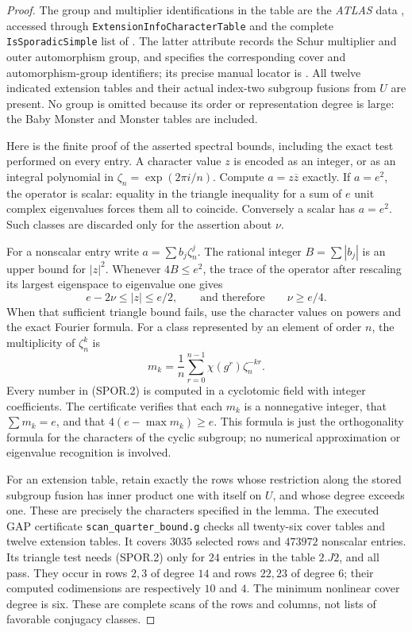 \begin{proof}
The group and multiplier identifications in the table are the
\emph{ATLAS} data \cite{SPOR:Atlas}, accessed through
\texttt{ExtensionInfoCharacterTable} and the complete
\texttt{IsSporadicSimple} list of \cite{SPOR:CTblLib}.
The latter attribute records the Schur multiplier and outer
automorphism group, and specifies the corresponding cover and
automorphism-group identifiers; its precise manual locator is
\cite[\S3.7, entry \texttt{ExtensionInfoCharacterTable}]{SPOR:CTblLib}.
All twelve indicated extension tables and their actual index-two
subgroup fusions from $U$ are present.  No group is omitted because
its order or representation degree is large: the Baby Monster and
Monster tables are included.

Here is the finite proof of the asserted spectral bounds, including
the exact test performed on every entry.  A character value $z$ is
encoded as an integer, or as an integral polynomial in
$\zeta_n=\exp(2\pi i/n)$.  Compute $a=z\overline z$ exactly.
If $a=e^2$, the operator is scalar: equality in the triangle
inequality for a sum of $e$ unit complex eigenvalues forces them
all to coincide.  Conversely a scalar has $a=e^2$.  Such classes
are discarded only for the assertion about $\nu$.

For a nonscalar entry write $a=\sum b_j\zeta_n^j$.  The rational
integer $B=\sum|b_j|$ is an upper bound for $|z|^2$.  Whenever
$4B\le e^2$, the trace of the operator after rescaling its largest
eigenspace to eigenvalue one gives
\[
 e-2\nu\le |z|\le e/2,
 \qquad\text{and therefore}\qquad \nu\ge e/4.       \tag{SPOR.1}
\]
When that sufficient triangle bound fails, use the character values
on powers and the exact Fourier formula.  For a class represented
by an element of order $n$, the multiplicity of $\zeta_n^k$ is
\[
 m_k=\frac1n\sum_{r=0}^{n-1}\chi(g^r)\zeta_n^{-kr}.
                                                               \tag{SPOR.2}
\]
Every number in (SPOR.2) is computed in a cyclotomic field with
integer coefficients.  The certificate verifies that each $m_k$
is a nonnegative integer, that $\sum m_k=e$, and that
$4(e-\max m_k)\ge e$.  This formula is just the orthogonality
formula for the characters of the cyclic subgroup; no numerical
approximation or eigenvalue recognition is involved.

For an extension table, retain exactly the rows whose restriction
along the stored subgroup fusion has inner product one with itself
on $U$, and whose degree exceeds one.  These are precisely the
characters specified in the lemma.  The executed GAP certificate
\texttt{scan\_quarter\_bound.g} checks all twenty-six cover tables
and twelve extension tables.  It covers $3035$ selected rows and
$473972$ nonscalar entries.  Its triangle test needs (SPOR.2) only
for $24$ entries in the table $2.J2$, and all pass.  They occur in
rows $2,3$ of degree $14$ and rows $22,23$ of degree $6$; their
computed codimensions are respectively $10$ and $4$.  The minimum
nonlinear cover degree is six.  These are complete scans of the
rows and columns, not lists of favorable conjugacy classes.


\end{proof}
